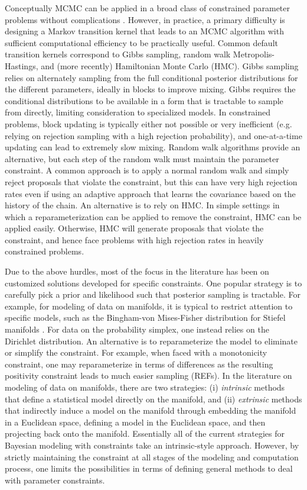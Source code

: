 \documentclass[10pt]{article}
\DeclareMathOperator{\1}{\mathbbm{1}}
\begin{document}
Conceptually MCMC can be applied in a broad class of constrained parameter problems without complications \cite{gelfand1992bayesian}. However, in practice, a primary difficulty is designing a Markov transition kernel that leads to an MCMC algorithm with sufficient computational efficiency to be practically useful. Common default transition kernels correspond to Gibbs sampling, random walk Metropolis-Hastings, and (more recently) Hamiltonian Monte Carlo (HMC). Gibbs sampling relies on alternately sampling from the full conditional posterior distributions for the different parameters, ideally in blocks to improve mixing. Gibbs requires the conditional distributions to be available in a form that is tractable to sample from directly, limiting consideration to specialized models. In constrained problems, block updating is typically either not possible or very inefficient (e.g. relying on rejection sampling with a high rejection probability), and one-at-a-time updating can lead to extremely slow mixing. Random walk algorithms provide an alternative, but each step of the random walk must maintain the parameter constraint. A common approach is to apply a normal random walk and simply reject proposals that violate the constraint, but this can have very high rejection rates even if using an adaptive approach that learns the covariance based on the history of the chain. An alternative is to rely on HMC. In simple settings in which a reparameterization can be applied to remove the constraint, HMC can be applied easily. Otherwise, HMC will generate proposals that violate the constraint, and hence face problems with high rejection rates in heavily constrained problems.

Due to the above hurdles, most of the focus in the literature has been on customized solutions developed for specific constraints.
One popular strategy is to carefully pick a prior and likelihood such that posterior sampling is tractable. For example, for modeling of data on manifolds, it is typical to restrict attention to specific models, such as the Bingham-von Mises-Fisher distribution for Stiefel manifolds \citep{khatri1977mises,hoff2009simulation}. For data on the probability simplex, one instead relies on the Dirichlet distribution. An alternative is to reparameterize the model to eliminate or simplify the constraint. For example, when faced with a monotonicity constraint, one may reparameterize in terms of differences as the resulting positivity constraint leads to much easier sampling (REFs). In the literature on modeling of data on manifolds, there are two strategies: (i) {\em intrinsic} methods that define a statistical model directly on the manifold, and (ii) {\em extrinsic} methods that indirectly induce a model on the manifold through embedding the manifold in a Euclidean space, defining a model in the Euclidean space, and then projecting back onto the manifold. Essentially all of the current strategies for Bayesian modeling with constraints take an intrinsic-style approach. However, by strictly maintaining the constraint at all stages of the modeling and computation process, one limits the possibilities in terms of defining general methods to deal with parameter constraints.
\end{document}
